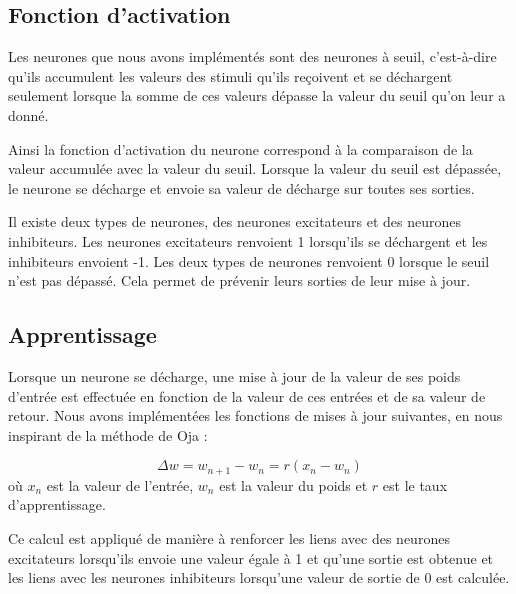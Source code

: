 \subsection{Fonction d'activation}
Les neurones que nous avons implémentés sont des neurones à seuil,
c'est-à-dire qu'ils accumulent les valeurs des stimuli qu'ils reçoivent et se
déchargent seulement lorsque la somme de ces valeurs dépasse la valeur du
seuil qu'on leur a donné.

Ainsi la fonction d'activation du neurone correspond à la comparaison de la
valeur accumulée avec la valeur du seuil. Lorsque la valeur du seuil est
dépassée, le neurone se décharge et envoie sa valeur de décharge sur toutes
ses sorties.

Il existe deux types de neurones, des neurones excitateurs et des
neurones inhibiteurs. Les neurones excitateurs renvoient 1 lorsqu'ils se
déchargent et les inhibiteurs envoient -1.
Les deux types de neurones renvoient 0 lorsque le seuil n'est pas dépassé.
Cela permet de prévenir leurs sorties de leur mise à jour.

\subsection{Apprentissage}
Lorsque un neurone se décharge, une mise à jour de la valeur de ses poids
d'entrée est effectuée en fonction de la valeur de ces entrées et de sa valeur
de retour. Nous avons implémentées les fonctions de mises à jour suivantes,
en nous inspirant de la méthode de Oja :

$$\Delta w = w_{n+1} - w_{n} = r (x_n - w_n)$$
où $x_n$ est la valeur de l'entrée, $w_n$ est la valeur du poids et
$r$ est le taux d'apprentissage.

Ce calcul est appliqué de manière à renforcer les liens avec des neurones
excitateurs lorsqu'ils envoie une valeur égale à 1 et qu'une sortie est
obtenue et les liens avec les neurones inhibiteurs lorsqu'une valeur de sortie
de 0 est calculée.
